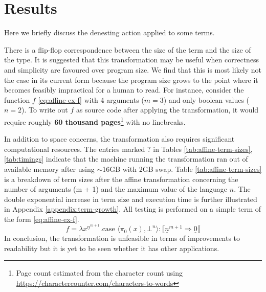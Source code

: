 \documentclass[12pt,a4paper]{report}
\theoremstyle{definition}
\theoremstyle{definition}
\theoremstyle{remark}
\begin{document}
\chapter{Results}\label{chapter:results}
Here we briefly discuss the denesting action applied to some terms. 

There is a flip-flop correspondence between the size of the term and the size of the type. It is suggested that this transformation may be useful when correctness and simplicity are favoured over program size. We find that this is most likely not the case in its current form because the program size grows to the point where it becomes feasibly impractical for a human to read. For instance, consider the function $f$ \eqref{eq:affine-ex-f} with 4 arguments ($m=3$) and only boolean values ($n=2$). To write out $f$ as source code after applying the transformation, it would require roughly \textbf{60 thousand pages}\footnote{Page count estimated from the character count using \url{https://charactercounter.com/characters-to-words}} with no linebreaks. 

In addition to space concerns, the transformation also requires significant computational resources. The entries marked $?$ in Tables \ref{tab:affine-term-sizes}, \ref{tab:timings} indicate that the machine running the transformation ran out of available memory after using $\sim$16GB with 2GB swap. Table \ref{tab:affine-term-sizes} is a breakdown of term sizes after the affine transformation concerning the number of arguments (m + 1) and the maximum value of the language $n$. The double exponential increase in term size and execution time is further illustrated in Appendix \ref{appendix:term-growth}. All testing is performed on a simple term of the form \eqref{eq:affine-ex-f}.
\begin{equation}\label{eq:affine-ex-f}
    f =\lambda x^{\underline{n}^{m+1}}. \text{case } \langle \pi_0(x), \bot^n \rangle : \llbracket \underline{n}^{m+1} \Rightarrow \underline{0} \llbracket 
\end{equation}
In conclusion, the transformation is unfeasible in terms of improvements to readability but it is yet to be seen whether it has other applications.
\end{document}
